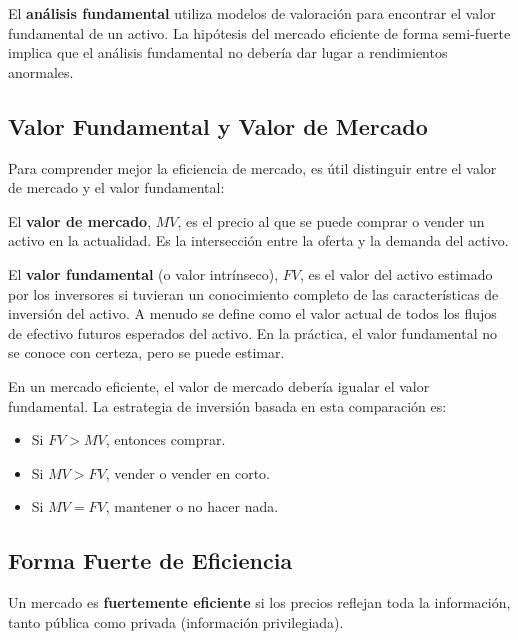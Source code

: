 \begin{definicion}
El \textbf{análisis fundamental} utiliza modelos de valoración para encontrar el valor fundamental de un activo. La hipótesis del mercado eficiente de forma semi-fuerte implica que el análisis fundamental no debería dar lugar a rendimientos anormales.
\end{definicion}

\subsection{Valor Fundamental y Valor de Mercado}

Para comprender mejor la eficiencia de mercado, es útil distinguir entre el valor de mercado y el valor fundamental:

\begin{definicion}
El \textbf{valor de mercado}, $MV$, es el precio al que se puede comprar o vender un activo en la actualidad. Es la intersección entre la oferta y la demanda del activo.
\end{definicion}

\begin{definicion}
El \textbf{valor fundamental} (o valor intrínseco), $FV$, es el valor del activo estimado por los inversores si tuvieran un conocimiento completo de las características de inversión del activo. A menudo se define como el valor actual de todos los flujos de efectivo futuros esperados del activo. En la práctica, el valor fundamental no se conoce con certeza, pero se puede estimar.
\end{definicion}

En un mercado eficiente, el valor de mercado debería igualar el valor fundamental. La estrategia de inversión basada en esta comparación es:
\begin{itemize}
\item Si $FV > MV$, entonces comprar.
\item Si $MV > FV$, vender o vender en corto.
\item Si $MV = FV$, mantener o no hacer nada.
\end{itemize}

\subsection{Forma Fuerte de Eficiencia}

\begin{definicion}
Un mercado es \textbf{fuertemente eficiente} si los precios reflejan toda la información, tanto pública como privada (información privilegiada).
\end{definicion}

